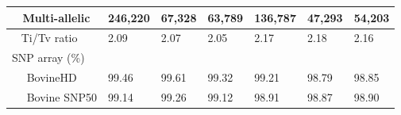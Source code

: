 \documentclass[../main.tex]{subfiles}
\begin{document}
\begin{landscape}
\begin{table}
\begin{tabular}{|l|l|l|l|l|l|l|}
        \hline
        ~ Multi-allelic                             & 246,220                                                                  & 67,328                                                                         & 63,789                                                                       & 136,787                                                                  & 47,293                                                                         & 54,203                                                                        \\ 
        \hline
        ~ Ti/Tv ratio                               & 2.09                                                                     & 2.07                                                                           & 2.05                                                                         & 2.17                                                                     & 2.18                                                                           & 2.16                                                                          \\ 
        \hline
        \multicolumn{7}{|l|}{SNP array (\%)}                                                                                                                                                                                                                                                                                                                                                                                                                                                                                               \\ 
        \hline
        ~~ BovineHD                                 & 99.46                                                                    & 99.61                                                                          & 99.32                                                                        & 99.21                                                                    & 98.79                                                                          & 98.85                                                                         \\ 
        \hline
        ~~ Bovine SNP50                             & 99.14                                                                    & 99.26                                                                          & 99.12                                                                        & 98.91                                                                    & 98.87                                                                          & 98.90                                                                         \\ 

\end{tabular}
\end{table}
\end{landscape}
\end{document}
